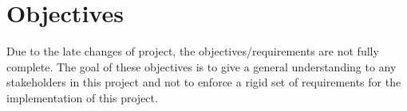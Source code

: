 \documentclass[a4paper,fleqn,10pt]{article}
\begin{document}


\section{Objectives}
\label{sec:objectives}
Due to the late changes of project, the objectives/requirements are not fully complete. The goal of these objectives
is to give a general understanding to any stakeholders in this project and not to enforce a rigid set of requirements
for the implementation of this project.
\end{document}
